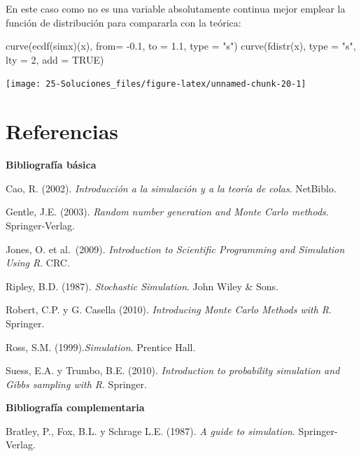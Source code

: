 \documentclass[
]{book}
\newenvironment{Shaded}{\begin{snugshade}}{\end{snugshade}}
\newcommand{\AttributeTok}[1]{\textcolor[rgb]{0.77,0.63,0.00}{#1}}
\newcommand{\ConstantTok}[1]{\textcolor[rgb]{0.00,0.00,0.00}{#1}}
\newcommand{\DecValTok}[1]{\textcolor[rgb]{0.00,0.00,0.81}{#1}}
\newcommand{\FloatTok}[1]{\textcolor[rgb]{0.00,0.00,0.81}{#1}}
\newcommand{\FunctionTok}[1]{\textcolor[rgb]{0.00,0.00,0.00}{#1}}
\newcommand{\NormalTok}[1]{#1}
\newcommand{\SpecialCharTok}[1]{\textcolor[rgb]{0.00,0.00,0.00}{#1}}
\newcommand{\StringTok}[1]{\textcolor[rgb]{0.31,0.60,0.02}{#1}}
\theoremstyle{break}
\theoremstyle{nonumberplain}
\begin{document}
\begin{enumerate}
  En este caso como no es una variable absolutamente continua mejor emplear
  la función de distribución para compararla con la teórica:

\begin{Shaded}
\begin{Highlighting}[]
\FunctionTok{curve}\NormalTok{(}\FunctionTok{ecdf}\NormalTok{(simx)(x), }\AttributeTok{from=} \SpecialCharTok{{-}}\FloatTok{0.1}\NormalTok{, }\AttributeTok{to =} \FloatTok{1.1}\NormalTok{, }\AttributeTok{type =} \StringTok{"s"}\NormalTok{)}
\FunctionTok{curve}\NormalTok{(}\FunctionTok{fdistr}\NormalTok{(x), }\AttributeTok{type =} \StringTok{"s"}\NormalTok{, }\AttributeTok{lty =} \DecValTok{2}\NormalTok{, }\AttributeTok{add =} \ConstantTok{TRUE}\NormalTok{)}
\end{Highlighting}
\end{Shaded}

  \begin{center}\texttt{[image: 25-Soluciones\_files/figure-latex/unnamed-chunk-20-1]} \end{center}
\end{enumerate}

\hypertarget{referencias}{%
\chapter*{Referencias}\label{referencias}}

\textbf{Bibliografía básica}

Cao, R. (2002). \emph{Introducción a la simulación y a la teoría de colas}. NetBiblo.

Gentle, J.E. (2003). \emph{Random number generation and Monte Carlo methods}. Springer‐Verlag.

Jones, O. et al.~(2009). \emph{Introduction to Scientific Programming and Simulation Using R}. CRC.

Ripley, B.D. (1987). \emph{Stochastic Simulation}. John Wiley \& Sons.

Robert, C.P. y G. Casella (2010). \emph{Introducing Monte Carlo Methods with R}. Springer.

Ross, S.M. (1999).\emph{Simulation}. Prentice Hall.

Suess, E.A. y Trumbo, B.E. (2010). \emph{Introduction to probability simulation and Gibbs sampling with R}. Springer.

\textbf{Bibliografía complementaria}

Bratley, P., Fox, B.L. y Schrage L.E. (1987). \emph{A guide to simulation}. Springer-Verlag.
\end{document}
